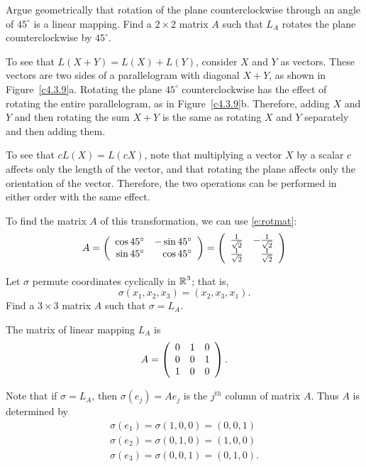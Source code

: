 \documentclass{ximera}
\begin{document}
\begin{exercise} \label{c4.3.9}
Argue geometrically that rotation of the plane counterclockwise
through an angle of $45^\circ$ is a linear mapping.  Find a
$2\times 2$ matrix $A$ such that $L_A$ rotates the plane
counterclockwise by $45^\circ$.

\begin{solution}

To see that $L(X + Y) = L(X) + L(Y)$, consider $X$ and $Y$ as
vectors.  These vectors are two sides of a parallelogram with
diagonal $X + Y$, as shown in Figure~\ref{c4.3.9}a.  Rotating
the plane $45^\circ$ counterclockwise has the effect of
rotating the entire parallelogram, as in Figure~\ref{c4.3.9}b.
Therefore, adding $X$ and $Y$ and then rotating the sum
$X + Y$ is the same as rotating $X$ and $Y$ separately and
then adding them.

\para To see that $cL(X) = L(cX)$, note that multiplying a
vector $X$ by a scalar $c$ affects only the length of the vector,
and that rotating the plane affects only the orientation of
the vector.  Therefore, the two operations can be performed in
either order with the same effect.

\para To find the matrix $A$ of this transformation, we can use
\eqref{e:rotmat}:
\[ A = \left(\begin{array}{rr} \cos 45^\circ & -\sin 45^\circ\\ \sin 45^\circ &\cos 45^\circ\end{array}\right)
= \left(\begin{array}{rr} \frac{1}{\sqrt{2}} & -\frac{1}{\sqrt{2}}\\ \frac{1}{\sqrt{2}} &\frac{1}{\sqrt{2}}\end{array}\right) \]

\begin{figure}[htb]
                       \centerline{%
                       }
\end{figure}

\end{solution}
\end{exercise}

\begin{exercise} \label{c4.3.10}
Let $\sigma$ permute coordinates cyclically in $\mbox{$\Bbb{R}$}^3$; that is,
\[
\sigma(x_1,x_2,x_3) = (x_2,x_3,x_1).
\]
Find a $3\times 3$ matrix $A$ such that $\sigma = L_A$.

\begin{solution}

\ans The matrix of linear mapping $L_A$ is
\[ A = \left(\begin{array}{rrr} 0 & 1 & 0 \\ 0 & 0 & 1 \\ 1 & 0 & 0\end{array}\right). \]

\soln Note that if $\sigma = L_A$, then $\sigma(e_j) = Ae_j$ is the
$j^{th}$ column of matrix $A$.  Thus $A$ is determined by
\[
\begin{array}{l}
\sigma(e_1) = \sigma(1,0,0) = (0,0,1) \\
\sigma(e_2) = \sigma(0,1,0) = (1,0,0) \\
\sigma(e_3) = \sigma(0,0,1) = (0,1,0). \end{array}
\]


\end{solution}
\end{exercise}
\end{document}

